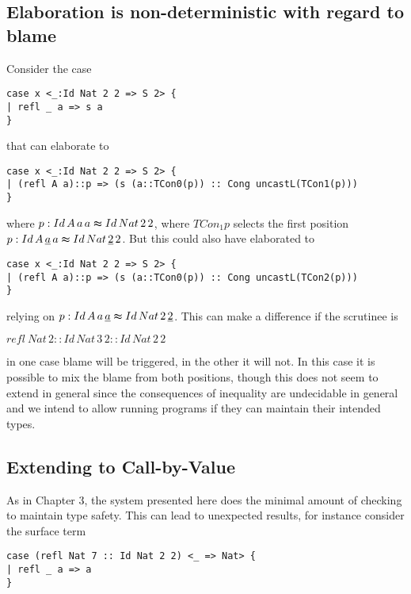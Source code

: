 \subsection{Elaboration is non-deterministic with regard to blame}

Consider the case

\begin{lstlisting}[basicstyle={\ttfamily\small}]
case x <_:Id Nat 2 2 => S 2> {
| refl _ a => s a
}
\end{lstlisting}

that can elaborate to

\begin{lstlisting}[basicstyle={\ttfamily\small}]
case x <_:Id Nat 2 2 => S 2> {
| (refl A a)::p => (s (a::TCon0(p)) :: Cong uncastL(TCon1(p)))
}
\end{lstlisting}

where $p:Id\,A\,a\,a\thickapprox Id\,Nat\,2\,2$, where $TCon_{1}p$
selects the first position $p:Id\,A\,\underline{a}\,a\thickapprox Id\,Nat\,\underline{2}\,2$.
But this could also have elaborated to 

\begin{lstlisting}[basicstyle={\ttfamily\small}]
case x <_:Id Nat 2 2 => S 2> {
| (refl A a)::p => (s (a::TCon0(p)) :: Cong uncastL(TCon2(p)))
}
\end{lstlisting}

relying on $p:Id\,A\,a\,\underline{a}\thickapprox Id\,Nat\,2\,\underline{2}$.
This can make a difference if the scrutinee is 

$refl\ Nat\,2::Id\,Nat\,3\,2::Id\,Nat\,2\,2$

in one case blame will be triggered, in the other it will not. In
this case it is possible to mix the blame from both positions, though
this does not seem to extend in general since the consequences of
inequality are undecidable in general and we intend to allow running
programs if they can maintain their intended types.

\subsection{Extending to Call-by-Value}

As in Chapter 3, the system presented here does the minimal amount
of checking to maintain type safety. This can lead to unexpected results,
for instance consider the surface term 

\begin{lstlisting}[basicstyle={\ttfamily\small}]
case (refl Nat 7 :: Id Nat 2 2) <_ => Nat> {
| refl _ a => a
}
\end{lstlisting}

